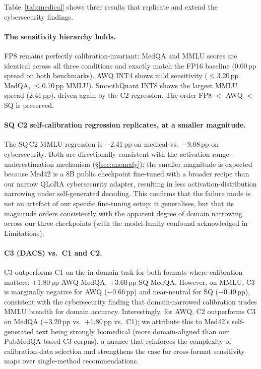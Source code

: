 \documentclass[11pt]{article}
\newcommand{\dacs}{DACS}
\begin{document}
Table~\ref{tab:medical} shows three results that replicate and extend
the cybersecurity findings.

\paragraph{The sensitivity hierarchy holds.}
\begin{sloppypar}
FP8 remains perfectly calibration-invariant: MedQA and MMLU scores
are identical across all three conditions and exactly match the
FP16 baseline (0.00\,pp spread on both benchmarks).  AWQ INT4
shows mild sensitivity ($\le$3.20\,pp MedQA, $\le$0.70\,pp MMLU).
SmoothQuant INT8 shows the largest MMLU spread (2.41\,pp), driven
again by the C2 regression.  The order FP8 $<$ AWQ $<$ SQ is
preserved.
\end{sloppypar}

\paragraph{SQ C2 self-calibration regression replicates, at a
smaller magnitude.}
The SQ\,C2 MMLU regression is $-$2.41\,pp on medical vs.\ $-$9.08\,pp
on cybersecurity.  Both are directionally consistent with the
activation-range-underestimation mechanism (\S\ref{sec:anomaly}): the
smaller magnitude is expected because Med42 is a 8B public checkpoint
fine-tuned with a broader recipe than our narrow QLoRA cybersecurity
adapter, resulting in less activation-distribution narrowing under
self-generated decoding.  This confirms that the failure mode is not
an artefact of our specific fine-tuning setup; it generalises, but
that its magnitude orders consistently with the apparent degree of domain narrowing across our three checkpoints (with the model-family confound acknowledged in Limitations).

\paragraph{C3 (\dacs{}) vs.\ C1 and C2.}
C3 outperforms C1 on the in-domain task for both formats where
calibration matters: $+$1.80\,pp AWQ MedQA, $+$3.60\,pp SQ MedQA.
However, on MMLU, C3 is marginally negative for AWQ ($-$0.66\,pp) and
near-neutral for SQ ($-$0.49\,pp), consistent with the cybersecurity
finding that domain-narrowed calibration trades MMLU breadth for domain
accuracy.  Interestingly, for AWQ, C2 outperforms C3 on MedQA
($+$3.20\,pp vs.\ $+$1.80\,pp vs.\ C1); we attribute this to
Med42's self-generated text being strongly biomedical (more domain-aligned
than our PubMedQA-based C3 corpus), a nuance that reinforces the
complexity of calibration-data selection and strengthens the case for
cross-format sensitivity maps over single-method recommendations.
\end{document}
